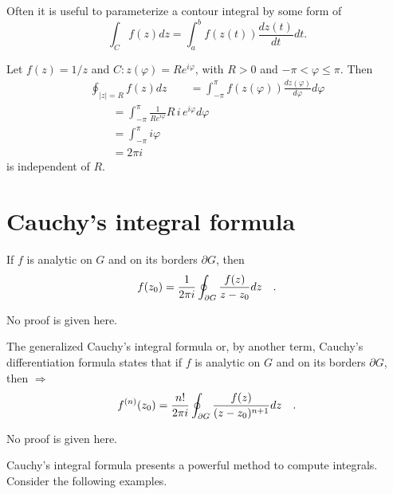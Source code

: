 Often it is useful to parameterize a contour integral by some form of
 \begin{equation}
\int_{C}f(z)dz= \int_{a}^b f(z(t))\frac{dz(t)}{dt} dt.
\end{equation}


{
\color{blue}
\bexample
Let $f(z) = 1/z$ and $C: z(\varphi )=R e^{i\varphi}$, with $R>0$ and $-\pi < \varphi \le \pi$. Then
\begin{equation}
\begin{array}  {l}
\oint_{\vert z\vert =R}
f (z) dz
\qquad =
\int_{-\pi}^\pi
f (z(\varphi ))\frac{dz(\varphi )}{d\varphi } d\varphi   \\
\qquad =
\int_{-\pi}^\pi
\frac{1}{R e^{i\varphi}}R \, i\, e^{i\varphi} d\varphi   \\
\qquad =
\int_{-\pi}^\pi
i\varphi   \\
\qquad =    2\pi i
\end{array}
\end{equation}
is independent of $R$.
\eexample
}



 \section{Cauchy's integral formula}
If $f$ is analytic on $G$ and on its borders $\partial G$, then
\begin{equation}
f(z_0)={1\over 2\pi i}\oint_{\partial G}{f(z)\over z-z_0}dz\quad
 .\end{equation}

No proof is given here.

The generalized Cauchy's integral formula or, by another term,
 Cauchy's differentiation formula
   states that if $f$ is analytic on $G$ and on its borders $\partial G$, then
 $\Longrightarrow$
\begin{equation}
f^{(n)}(z_0)={n!\over 2\pi i}\oint_{\partial G}{f(z)\over
 (z-z_0)^{n+1}}dz\quad
 .\end{equation}

No proof is given here.

Cauchy's integral formula presents a powerful method to compute integrals.
Consider the following examples.

